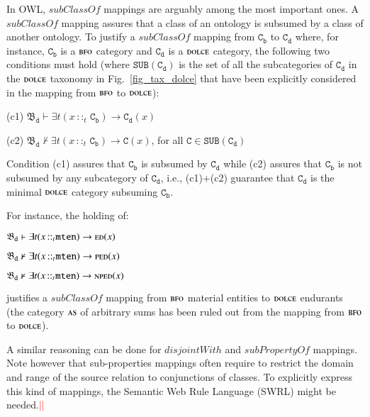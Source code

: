 \documentclass[ao]{iosart2x}
\newcommand{\nb}[1]{\textcolor{red}{$|$}\marginpar{\hspace*{-0cm}\parbox{20mm}{\scriptsize\raggedright\textcolor{red}{#1}}}}
\newcommand{\bflist}{\begin{list}{}{\setlength{\topsep}{2mm}\setlength{\parsep}{0mm}\setlength{\leftmargin}{9.2mm}\setlength{\labelwidth}{8mm}}}
\newcommand{\eflist}{\end{list}}
\newcommand{\pr}[1]{\mathtt{#1}}
\newcommand{\cn}[1]{\mathtt{#1}}
\newcommand{\dolce}{{\textsc{dolce}}}
\newcommand{\bfo}{{\textsc{bfo}}}
\newcommand {\thbfobdmap} {\ensuremath{\mathfrak{B}_\texttt{d}}}
\newcommand {\ASdcat} {\textsc{as}}
\newcommand {\EDdcat} {\textsc{ed}}
\newcommand {\NPEDdcat} {\textsc{nped}}
\newcommand {\PEDdcat} {\textsc{ped}}
\newcommand{\mtenbcat}{\cn{mten}}
\newcommand{\bfoiof}[1]{{\,::_{#1\:\!}}}
\begin{document}
In OWL, $\mathit{subClassOf}$ mappings are arguably among the most important ones. A $\mathit{subClassOf}$ mapping assures that a class of an ontology is subsumed by a class of another ontology. To justify a $\mathit{subClassOf}$ mapping from $\pr{C_b}$ to $\pr{C_d}$ where, for instance, $\pr{C_b}$ is a $\bfo$ category and $\pr{C_d}$ is a $\dolce$ category, the following two conditions must hold (where $\pr{SUB}(\pr{C_d})$ is the set of all the subcategories of $\pr{C_d}$ in the $\dolce$ taxonomy in Fig.~\ref{fig_tax_dolce} that have been explicitly considered in the mapping from $\bfo$ to $\dolce$):
\bflist
\item[(c1)] $\thbfobdmap \vdash \exists t(x \bfoiof{t} \cn{C_b}) \to \pr{C_d}(x)$ 
\item[(c2)] $\thbfobdmap \nvdash \exists t(x \bfoiof{t}  \cn{C_b}) \to \pr{C}(x)$, for all $\pr{C} \in \pr{SUB}(\pr{C_d})$ 
\eflist
%
Condition (c1) assures that $\pr{C_b}$ is subsumed by $\pr{C_d}$ while (c2) assures that $\pr{C_b}$ is not subsumed by any subcategory of $\pr{C_d}$, i.e., (c1)+(c2) guarantee that $\pr{C_d}$ is the minimal $\dolce$ category subsuming $\pr{C_b}$.  

For instance, the holding of:
%
\bflist
\item[] $\thbfobdmap \vdash \exists t(x \bfoiof{t} \mtenbcat) \to \EDdcat(x)$ 
\item[] $\thbfobdmap \nvdash \exists t(x \bfoiof{t} \mtenbcat) \to \PEDdcat(x)$ 
\item[] $\thbfobdmap \nvdash \exists t(x \bfoiof{t} \mtenbcat) \to \NPEDdcat(x)$ 
\eflist
justifies a $\mathit{subClassOf}$ mapping from $\bfo$ material entities to $\dolce$ endurants (the category $\ASdcat$ of arbitrary sums has been ruled out from the mapping from $\bfo$ to $\dolce$). 

A similar reasoning can be done for $\mathit{disjointWith}$ and $\mathit{subPropertyOf}$ mappings. Note however that sub-properties mappings often require to restrict the domain and range of the source relation to conjunctions of classes.  To explicitly express this kind of mappings, the Semantic Web Rule Language (SWRL)  \citep{swirl} %
might be needed.\nb{CM: non sono sicurissimo di questo, non ricordo più bene, inoltre serve un riferimento}\nb{SB: ho indebolito mettendo "might", direi di lasciare così}
\end{document}
